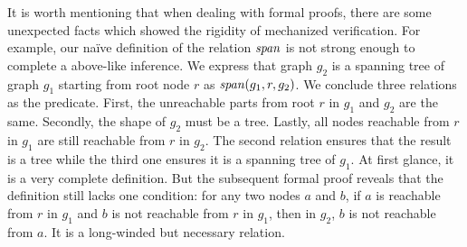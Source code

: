 It is worth mentioning that when dealing with formal proofs, there are
some unexpected facts which showed the rigidity of mechanized
verification. For example, our na\"ive definition of the relation
$\mathit{span}$ is not strong enough to complete a above-like inference. We
express that graph $g_2$ is a spanning tree of graph $g_1$ starting
from root node $r$ as $\mathit{span}(g_1, r, g_2)$. We conclude three
relations as the predicate. First, the unreachable parts from root $r$
in $g_1$ and $g_2$ are the same. Secondly, the shape of $g_2$ must be
a tree. Lastly, all nodes reachable from $r$ in $g_1$ are still
reachable from $r$ in $g_2$. The second relation ensures that the
result is a tree while the third one ensures it is a spanning tree of
$g_1$. At first glance, it is a very complete definition. But the
subsequent formal proof reveals that the definition still lacks one
condition: for any two nodes $a$ and $b$, if $a$ is reachable from $r$
in $g_1$ and $b$ is not reachable from $r$ in $g_1$, then in $g_2$,
$b$ is not reachable from $a$. It is a long-winded but necessary
relation.

